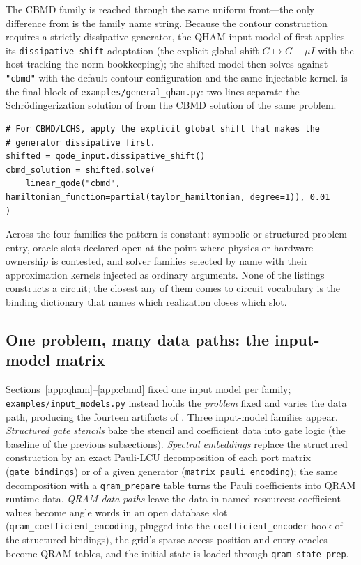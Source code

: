 The CBMD family is reached through the same uniform front---the only
difference from  is the family name string.
Because the contour construction requires a strictly dissipative
generator, the QHAM input model of  first applies
its \texttt{dissipative\_shift} adaptation (the explicit global shift
$G \mapsto G - \mu I$ with the host tracking the norm bookkeeping); the
shifted model then solves against \texttt{"cbmd"} with the default contour
configuration and the same injectable kernel.  
is the final block of \texttt{examples/general\_qham.py}: two lines
separate the Schr\"odingerization solution of 
from the CBMD solution of the same problem.

\begin{lstlisting}[style=pyqpython, caption={CBMD: the same QHAM input model after \texttt{dissipative\_shift}, solved by naming the family (verbatim from the final block of \texttt{examples/general\_qham.py}; comments translated).}, label={lst:cbmd}]
# For CBMD/LCHS, apply the explicit global shift that makes the
# generator dissipative first.
shifted = qode_input.dissipative_shift()
cbmd_solution = shifted.solve(
    linear_qode("cbmd", hamiltonian_function=partial(taylor_hamiltonian, degree=1)), 0.01
)
\end{lstlisting}

Across the four families the pattern is constant: symbolic or structured
problem entry, oracle slots declared open at the point where physics or
hardware ownership is contested, and solver families selected by name with
their approximation kernels injected as ordinary arguments.  None of the
listings constructs a circuit; the closest any of them comes to circuit
vocabulary is the binding dictionary that names which realization closes
which slot.

\subsection{One problem, many data paths: the input-model matrix}
\label{app:input-models}

Sections~\ref{app:qham}--\ref{app:cbmd} fixed one input model per family;
\texttt{examples/input\_models.py} instead holds the \emph{problem} fixed
and varies the data path, producing the fourteen artifacts of
.  Three input-model families
appear.  \emph{Structured gate stencils} bake the stencil and coefficient
data into gate logic (the baseline of the previous subsections).
\emph{Spectral embeddings} replace the structured construction by an
exact Pauli-LCU decomposition of each port matrix
(\texttt{gate\_bindings}) or of a given generator
(\texttt{matrix\_pauli\_encoding}); the same decomposition with a
\texttt{qram\_prepare} table turns the Pauli coefficients into QRAM
runtime data.  \emph{QRAM data paths} leave the data in named resources:
coefficient values become angle words in an open database slot
(\texttt{qram\_coefficient\_encoding}, plugged into the
\texttt{coefficient\_encoder} hook of the structured bindings), the
grid's sparse-access position and entry oracles become QRAM tables, and
the initial state is loaded through \texttt{qram\_state\_prep}.

